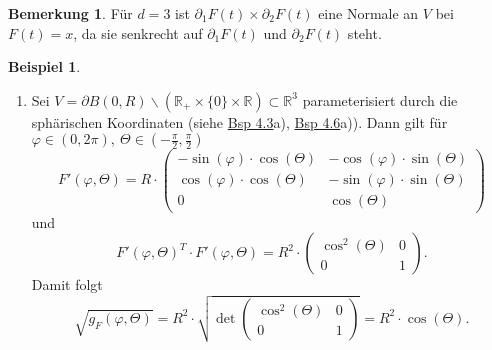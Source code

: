 \documentclass[a4paper]{scrreprt}
\newcommand{\R}{\mathbb{R}}
\newcommand{\jlabel}[1]{\label{j_#1}}
\newcommand{\jhyperref}[2]{\hyperref[j_#1]{#2}}
\newcommand{\jlink}[1]{\jhyperref{#1}{#1}}
\theoremstyle{plain}
\theoremstyle{definition}
\newtheorem{expl}[thm]{Beispiel}
\newtheorem*{bem*}{Bemerkung}
\begin{document}
{{{{\begin{bem*}
    Für $d=3$ ist $\partial_1 F(t) \times \partial_2 F(t)$ eine Normale an $V$ bei $F(t)=x$, da sie senkrecht auf $\partial_1 F(t)$ und  $\partial_2 F(t)$ steht.
\end{bem*}

\jlabel{Bsp 4.9}
\begin{expl}
    \begin{enumerate}
        \item 
            \jlabel{Bsp 4.9a)}
            Sei $V = \partial B(0,R) \backslash (\R_+ \times \{0\} \times \R) \subset \R^3$ parameterisiert durch die sphärischen Koordinaten (siehe \jlink{Bsp 4.3}a), \jlink{Bsp 4.6}a)). Dann gilt für $\varphi \in (0,2\pi), \ \Theta \in (-\frac{\pi}{2},\frac{\pi}{2})$
            \[
                F'(\varphi, \Theta) = R \cdot \begin{pmatrix}
                                                 -\sin(\varphi)\cdot \cos(\Theta)  &  -\cos(\varphi)\cdot \sin(\Theta) \\
                                                 \cos(\varphi)\cdot \cos(\Theta)   &  -\sin(\varphi)\cdot \sin(\Theta) \\
                                                 0                                 &   \cos(\Theta)
                                             \end{pmatrix}
            \]
            und
            \[
                F'(\varphi,\Theta)^T\cdot F'(\varphi,\Theta) = R^2\cdot \begin{pmatrix}
                                                                            \cos^2(\Theta) & 0 \\
                                                                            0              & 1
                                                                        \end{pmatrix}.
            \]
            Damit folgt
            \[
                \sqrt{g_F(\varphi, \Theta)} = R^2 \cdot \sqrt{\det \begin{pmatrix}
                                                                        \cos^2(\Theta) & 0 \\
                                                                        0              & 1
                                                                    \end{pmatrix}} = R^2\cdot \cos(\Theta).
            \]
            

\end{enumerate}
\end{expl}}}}}
\end{document}

